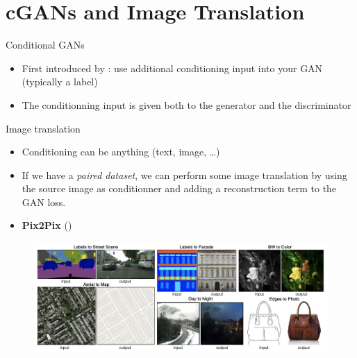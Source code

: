 \documentclass{beamer}
\begin{document}
\section{cGANs and Image Translation}

\begin{frame}{Conditional GANs}
    \begin{itemize}
        \item First introduced by \cite{cgan}: use additional conditioning input into your GAN (typically a label)
        \item The conditionning input is given both to the generator and the discriminator
    \end{itemize}
    \begin{figure}
        \centering
    \end{figure}
\end{frame}

\begin{frame}{Image translation}
\begin{itemize}
    \item Conditioning can be anything (text, image, \dots)
    \item If we have a \emph{paired dataset}, we can perform some image translation by using the source image as conditionner and adding a reconstruction term to the GAN loss.
    \item \textcolor{cBlue}{\textbf{Pix2Pix}} (\cite{pix2pix})
\end{itemize}
    \begin{figure}
        \centering
        \includegraphics[width=0.7\linewidth]{images/pix2pix.png}
    \end{figure}
    
\end{frame}
  
\end{document}
